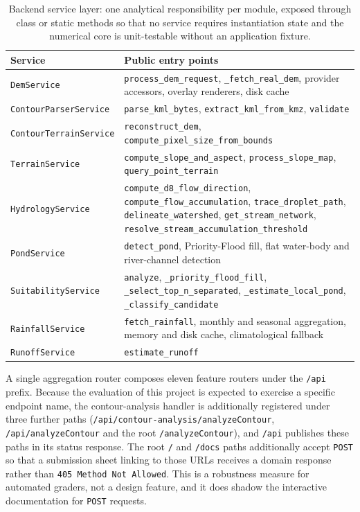 \documentclass[sigconf,review,10pt]{acmart}
\newcommand{\cb}{\allowbreak}
\newcommand{\codelong}[1]{\texttt{#1}}
\begin{document}
\begin{table}[t]
\caption{Backend service layer: one analytical responsibility per module,
exposed through class or static methods so that no service requires
instantiation state and the numerical core is unit-testable without an
application fixture.}
\label{tab:services}
\small
\begin{tabular}{@{}R{4.2cm}R{12.3cm}@{}}
\toprule
\textbf{Service} & \textbf{Public entry points} \\
\midrule
\texttt{DemService} & \texttt{process\_dem\_request}, \texttt{\_fetch\_real\_dem}, provider accessors, overlay renderers, disk cache \\
\codelong{ContourParserService} & \texttt{parse\_kml\_bytes}, \codelong{extract\_\cb{}kml\_\cb{}from\_\cb{}kmz}, \texttt{validate} \\
\codelong{ContourTerrainService} & \texttt{reconstruct\_dem}, \codelong{compute\_\cb{}pixel\_\cb{}size\_\cb{}from\_\cb{}bounds} \\
\texttt{TerrainService} & \codelong{compute\_\cb{}slope\_\cb{}and\_\cb{}aspect}, \texttt{process\_slope\_map}, \texttt{query\_point\_terrain} \\
\texttt{HydrologyService} & \codelong{compute\_\cb{}d8\_\cb{}flow\_\cb{}direction}, \codelong{compute\_\cb{}flow\_\cb{}accumulation}, \texttt{trace\_droplet\_path}, \texttt{delineate\_watershed}, \texttt{get\_stream\_network}, \codelong{resolve\_\cb{}stream\_\cb{}accumulation\_\cb{}threshold} \\
\texttt{PondService} & \texttt{detect\_pond}, Priority-Flood fill, flat water-body and river-channel detection \\
\texttt{SuitabilityService} & \texttt{analyze}, \codelong{\_\cb{}priority\_\cb{}flood\_\cb{}fill}, \codelong{\_\cb{}select\_\cb{}top\_\cb{}n\_\cb{}separated}, \codelong{\_\cb{}estimate\_\cb{}local\_\cb{}pond}, \texttt{\_classify\_candidate} \\
\texttt{RainfallService} & \texttt{fetch\_rainfall}, monthly and seasonal aggregation, memory and disk cache, climatological fallback \\
\texttt{RunoffService} & \texttt{estimate\_runoff} \\
\bottomrule
\end{tabular}
\end{table}

A single aggregation router composes eleven feature routers under the
\texttt{/api} prefix. Because the evaluation of this project is expected
to exercise a specific endpoint name, the contour-analysis handler is
additionally registered under three further paths
(\codelong{/\cb{}api/\cb{}contour-analysis/\cb{}analyzeContour},
\texttt{/api/analyzeContour} and the root \texttt{/analyzeContour}), and
\texttt{/api} publishes these paths in its status response. The root
\texttt{/} and \texttt{/docs} paths additionally accept \texttt{POST} so
that a submission sheet linking to those URLs receives a domain response
rather than \codelong{405 Method Not Allowed}. This is a robustness measure
for automated graders, not a design feature, and it does shadow the
interactive documentation for \texttt{POST} requests.
\end{document}

